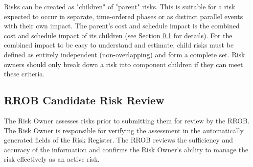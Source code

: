 Risks can be created as "children" of "parent" risks. This is suitable for a risk expected to occur in separate, time-ordered phases or as distinct parallel events with their own impact.
The parent's cost and schedule impact is the combined cost and schedule impact of its children (see Section \ref{sec:risk-review} for details).
For the combined impact to be easy to understand and estimate, child risks must be defined as entirely independent (non-overlapping) and form a complete set.
Risk owners should only break down a risk into component children if they can meet these criteria.

\subsection{RROB Candidate Risk Review}
\label{sec:risk-review}

The Risk Owner assesses risks prior to submitting them for review by the RROB.
The Risk Owner is responsible for verifying the assessment in the automatically generated fields of the Risk Register.
The RROB reviews the sufficiency and accuracy of the information and confirms the Risk Owner's ability to manage the risk effectively as an active risk.

